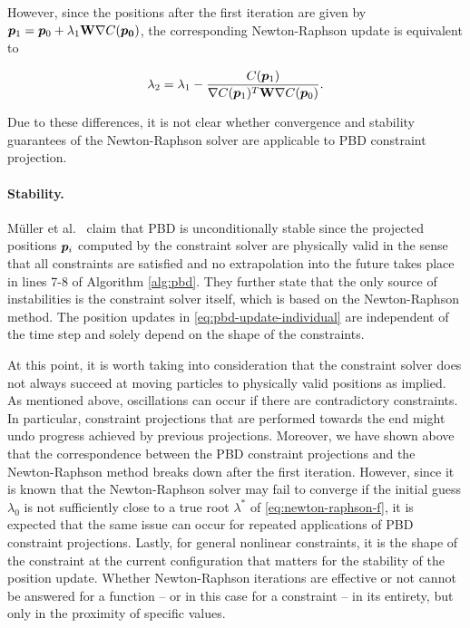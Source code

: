 \noindent However, since the positions after the first iteration are given by $\bm{p}_1 = \bm{p}_0 + \lambda_1 \mathbf{W} \nabla C(\bm{p_0})$, 
the corresponding Newton-Raphson update is equivalent to 

\[
    \lambda_2 = \lambda_1 - \frac{C(\bm{p}_1)}{\nabla C(\bm{p}_1)^T \mathbf{W} \nabla C(\bm{p}_0)}.
\]

\noindent Due to these differences, it is not clear whether convergence and stability guarantees of the Newton-Raphson solver are applicable to 
PBD constraint projection.

\paragraph{Stability.}
Müller et al.\ \cite{mueller2006} claim that PBD is unconditionally stable since the projected positions $\bm{p}_i$ computed by the constraint 
solver are physically valid in the sense that all constraints are satisfied and no extrapolation into the future takes place in lines 7-8 of
Algorithm \ref{alg:pbd}. They further state that the only source of instabilities is the constraint solver itself, which is based on the 
Newton-Raphson method. The position updates in \autoref{eq:pbd-update-individual} are independent of the time step and solely depend on the 
shape of the constraints. 

At this point, it is worth taking into consideration that the constraint solver does not always succeed at moving 
particles to physically valid positions as implied. As mentioned above, oscillations can occur if there are contradictory constraints. 
In particular, constraint projections that are performed towards the end might undo progress achieved by previous projections. 
Moreover, we have shown above that the correspondence between the PBD constraint projections and the Newton-Raphson method breaks down 
after the first iteration. However, since it is known that the Newton-Raphson solver may fail to converge if the initial guess $\lambda_0$
is not sufficiently close to a true root $\lambda^*$ of \autoref{eq:newton-raphson-f}, it is expected that the same issue can occur for 
repeated applications of PBD constraint projections. Lastly, for general nonlinear constraints, it is the shape of the constraint at the 
current configuration that matters for the stability of the position update. Whether Newton-Raphson iterations are effective or not cannot be 
answered for a function -- or in this case for a constraint -- in its entirety, but only in the proximity of specific values.

